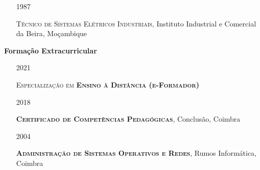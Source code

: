 \documentclass[10pt,a4paper,oneside]{article}
\newlength{\datewidth}
\newlength{\textindent}
\begin{document}
\begin{itemize}
		
		\item[\hspace{\datewidth}\scriptsize 1987] \parbox[t]{\dimexpr\linewidth-\datewidth-\textindent}{\textsc{Técnico de Sistemas Elétricos Industriais}, Instituto Industrial e Comercial da Beira, Moçambique}
	\end{itemize}
	
	\vspace{5mm}
	
	\textbf{\hspace{\textindent}Formação Extracurricular}
	\begin{itemize}
		\item[\hspace{\datewidth}\scriptsize 2021] \parbox[t]{\dimexpr\linewidth-\datewidth-\textindent}{\textsc{Especialização em \textbf{Ensino à Distância (e-Formador)}}}
		\item[\hspace{\datewidth}\scriptsize 2018] \parbox[t]{\dimexpr\linewidth-\datewidth-\textindent}{\textsc{\textbf{Certificado de Competências Pedagógicas}}, Conclusão, Coimbra}
		\item[\hspace{\datewidth}\scriptsize 2004] \parbox[t]{\dimexpr\linewidth-\datewidth-\textindent}{\textsc{\textbf{Administração de Sistemas Operativos e Redes}}, Rumos Informática, Coimbra}
	\end{itemize}
	
\end{document}
